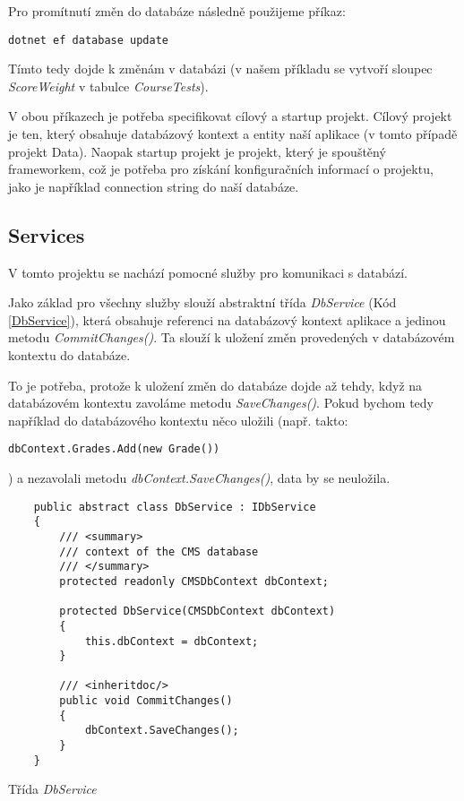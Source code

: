Pro promítnutí změn do databáze následně použijeme příkaz:

\begin{lstlisting}
dotnet ef database update
\end{lstlisting}

Tímto tedy dojde k změnám v databázi (v našem příkladu se vytvoří sloupec \textit{ScoreWeight} v tabulce \textit{CourseTests}).

V obou příkazech je potřeba specifikovat cílový a startup projekt. Cílový projekt je ten, který obsahuje databázový kontext a entity naší aplikace (v tomto případě projekt Data). Naopak startup projekt je projekt, který je spouštěný frameworkem, což je potřeba pro získání konfiguračních informací o projektu, jako je například connection string do naší databáze.

\subsection{Services}
V tomto projektu se nachází pomocné služby pro komunikaci s databází. 

Jako základ pro všechny služby slouží abstraktní třída \textit{DbService} (Kód \ref{DbService}), která obsahuje referenci na databázový kontext aplikace a jedinou metodu \textit{CommitChanges()}. Ta slouží k uložení změn provedených v databázovém kontextu do databáze. 

To je potřeba, protože k uložení změn do databáze dojde až tehdy, když na databázovém kontextu zavoláme metodu \textit{SaveChanges()}. Pokud bychom tedy například do databázového kontextu něco uložili (např. takto: 
\begin{lstlisting}
dbContext.Grades.Add(new Grade())
\end{lstlisting})
a nezavolali metodu \textit{dbContext.SaveChanges()}, data by se neuložila.

\begin{program}
	\begin{lstlisting}
	public abstract class DbService : IDbService
	{
		/// <summary>
		/// context of the CMS database
		/// </summary>
		protected readonly CMSDbContext dbContext;
		
		protected DbService(CMSDbContext dbContext)
		{
			this.dbContext = dbContext;
		}
		
		/// <inheritdoc/>
		public void CommitChanges()
		{
			dbContext.SaveChanges();
		}
	}
	\end{lstlisting}
	\caption{Třída \textit{DbService}}
	\label{DbService}
\end{program}

